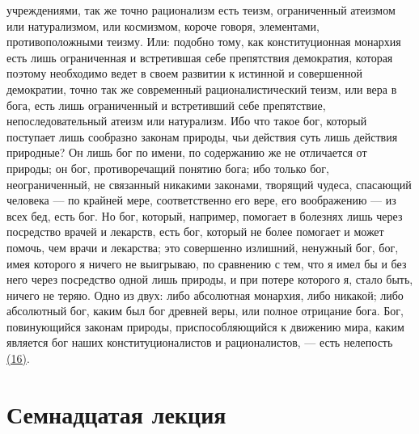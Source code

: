 \documentclass[12pt]{article}
\begin{document}
учреждениями, так же точно рационализм есть теизм, ограниченный атеизмом или натурализмом, или космизмом, короче говоря, элементами, противоположными теизму. Или: подобно тому, как конституционная монархия есть лишь ограниченная и встретившая себе препятствия демократия, которая поэтому необходимо ведет в своем развитии к истинной и совершенной демократии, точно так же современный рационалистический теизм, или вера в бога, есть лишь ограниченный и встретивший себе препятствие, непоследовательный атеизм или натурализм. Ибо что такое бог, который поступает лишь сообразно законам природы, чьи действия суть лишь действия природные? Он лишь бог по имени, по содержанию же не отличается от природы; он бог, противоречащий понятию бога; ибо только бог, неограниченный, не связанный никакими законами, творящий чудеса, спасающий человека --- по крайней мере, соответственно его вере, его воображению --- из всех бед, есть бог. Но бог, который, например, помогает в болезнях лишь через посредство врачей и лекарств, есть бог, который не более помогает и может помочь, чем врачи и лекарства; это совершенно излишний, ненужный бог, бог, имея которого я ничего не выигрываю, по сравнению с тем, что я имел бы и без него через посредство одной лишь природы, и при потере которого я, стало быть, ничего не теряю. Одно из двух: либо абсолютная монархия, либо никакой; либо абсолютный бог, каким был бог древней веры, или полное отрицание бога. Бог, повинующийся законам природы, приспособляющийся к движению мира, каким является бог наших конституционалистов и рационалистов, --- есть нелепость \hyperlink{16}{(16)}\hypertarget{b16}{}. 

{}
\section*{Семнадцатая лекция}
\end{document}
